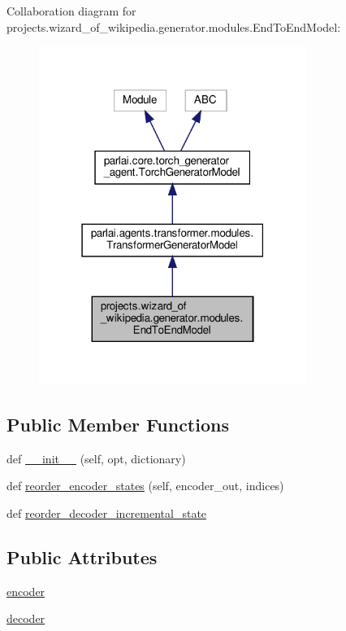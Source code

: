 Collaboration diagram for projects.\+wizard\+\_\+of\+\_\+wikipedia.\+generator.\+modules.\+End\+To\+End\+Model\+:\nopagebreak
\begin{figure}[H]
\begin{center}
\leavevmode
\includegraphics[width=247pt]{da/d8e/classprojects_1_1wizard__of__wikipedia_1_1generator_1_1modules_1_1EndToEndModel__coll__graph}
\end{center}
\end{figure}
\subsection*{Public Member Functions}
\begin{DoxyCompactItemize}
\item 
def \hyperlink{classprojects_1_1wizard__of__wikipedia_1_1generator_1_1modules_1_1EndToEndModel_a247a986cf18f9711f93d2336d653779e}{\+\_\+\+\_\+init\+\_\+\+\_\+} (self, opt, dictionary)
\item 
def \hyperlink{classprojects_1_1wizard__of__wikipedia_1_1generator_1_1modules_1_1EndToEndModel_a619ee6377355376fd7fe43779dc54bea}{reorder\+\_\+encoder\+\_\+states} (self, encoder\+\_\+out, indices)
\item 
def \hyperlink{classprojects_1_1wizard__of__wikipedia_1_1generator_1_1modules_1_1EndToEndModel_a43e9de2e4b0239b9e9a13e5543793a21}{reorder\+\_\+decoder\+\_\+incremental\+\_\+state}
\end{DoxyCompactItemize}
\subsection*{Public Attributes}
\begin{DoxyCompactItemize}
\item 
\hyperlink{classprojects_1_1wizard__of__wikipedia_1_1generator_1_1modules_1_1EndToEndModel_a4d6ecf9a0df55b1124ffd4eec6bfb018}{encoder}
\item 
\hyperlink{classprojects_1_1wizard__of__wikipedia_1_1generator_1_1modules_1_1EndToEndModel_ab5c118e09c397fc75ccf49fb45119bd1}{decoder}
\end{DoxyCompactItemize}



